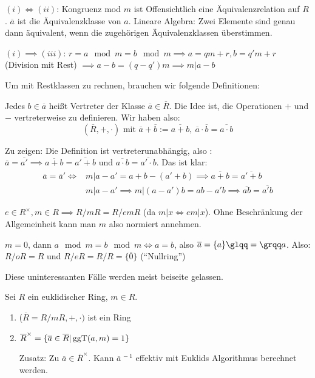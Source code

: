 \documentclass[a4paper,twoside,DIV15,BCOR12mm]{scrbook}
\begin{document}
\begin{beweis}
$(i) \iff (ii)$: Kongruenz mod $m$ ist Offensichtlich eine
Äquivalenzrelation auf $R$. $\overline a$ ist die Äquivalenzklasse
von $a$. Lineare Algebra: Zwei Elemente sind genau dann äquivalent,
wenn die zugehörigen Äquivalenzklassen überstimmen.

$(i) \implies (iii)$: $r = a \mod m = b\mod m \implies a = qm + r,
b= q'm + r$ (Division mit Rest) $\implies a - b = (q-q')m \implies m
| a-b$
\end{beweis}

Um mit Restklassen zu rechnen, brauchen wir folgende Definitionen:
\begin{definition}
Jedes $b\in \overline a$ heißt Vertreter der Klasse $\overline a \in
\overline R$. Die Idee ist, die Operationen $+$ und $-$
vertreterweise zu definieren. Wir haben also:
\[ (\overline R, +, \cdot)\text{ mit } \overline a + \overline b  := \overline {a+b},\ \overline a \cdot \overline b = \overline{a\cdot b} \]
\end{definition}

Zu zeigen: Die Definition ist vertreterunabhängig, also : $\overline
a = \overline {a'} \implies \overline {a+b} = \overline {a'+b}
\text{ und } \overline {a\cdot b} = \overline {a'\cdot b}$. Das ist
klar:
\begin{align*}
\overline a = \overline a' \iff &m|a-a' = a+b - (a'+b) \implies \overline {a+b} = \overline {a'+b} \\
&m|a-a' \implies m|(a-a')b = ab - a'b \implies \overline {ab} =
\overline {a'b}
\end{align*}

\begin{bemerkung}
$e\in R^\times, m \in R \implies R/mR = R/emR$ (da $m|x \iff em|x$).
Ohne Beschränkung der Allgemeinheit kann man $m$ also normiert
annehmen.

$m=0$, dann $a\mod m = b\mod m\iff a=b$, also $\overline a = \{a\}
\text{\glqq}=\text{\grqq} a$. Also: $R/oR = R$ und $R/eR = R/R =
\{\overline 0\}$ ("`Nullring"')
\end{bemerkung}

Diese uninteressanten Fälle werden meist beiseite gelassen.

\begin{satz}
Sei $R$ ein euklidischer Ring, $m\in R$.
\begin{enumerate}
\item ($\overline R = R/mR, +, \cdot)$ ist ein Ring
\item $\overline R^\times = \{\overline a \in \overline R| \mathop{\rm ggT}\nolimits(a,m) = 1\}$

Zusatz: Zu $\overline a \in \overline R^\times$. Kann ${\overline
a}^{\,-1}$ effektiv mit Euklids Algorithmus berechnet werden.
\end{enumerate}
\end{satz}
\end{document}
